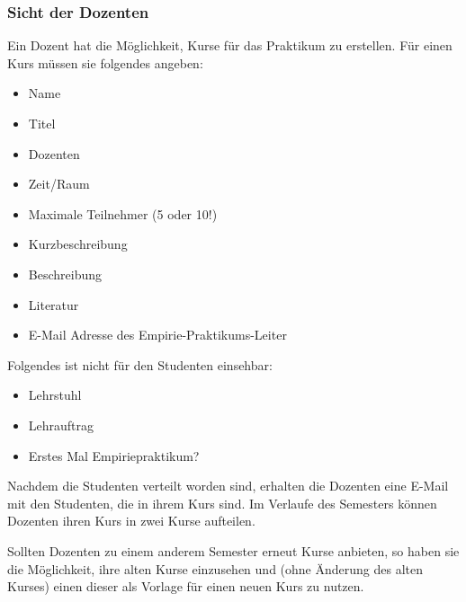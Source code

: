 \documentclass[12pt,a4paper]{article}
\begin{document}
                
            \subsubsection{Sicht der Dozenten}
            Ein Dozent hat die Möglichkeit, Kurse für das Praktikum zu erstellen. Für einen Kurs müssen sie folgendes angeben:
            \begin{itemize}
            \item Name
            \item Titel
            \item Dozenten
            \item Zeit/Raum
            \item Maximale Teilnehmer (5 oder 10!)
            \item Kurzbeschreibung
            \item Beschreibung
            \item Literatur
            \item E-Mail Adresse des Empirie-Praktikums-Leiter %
            \end{itemize}
            Folgendes ist nicht für den Studenten einsehbar:
            \begin{itemize}
            \item Lehrstuhl
            \item Lehrauftrag
            \item Erstes Mal Empiriepraktikum?
            \end{itemize}
            
            Nachdem die Studenten verteilt worden sind, erhalten die Dozenten eine E-Mail mit den Studenten, die in ihrem Kurs sind.
            Im Verlaufe des Semesters können Dozenten ihren Kurs in zwei Kurse aufteilen.
            
            Sollten Dozenten zu einem anderem Semester erneut Kurse anbieten, so haben sie die Möglichkeit, ihre alten Kurse einzusehen und (ohne Änderung des alten Kurses) einen dieser als Vorlage für einen neuen Kurs zu nutzen.

                
\end{document}

